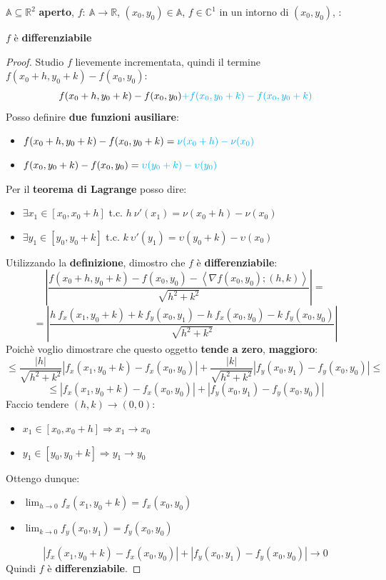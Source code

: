 \documentclass[a4paper, oneside]{article}
\newcommand\R{\mathbb{R}}
\newcommand\C{\mathbb{C}}
\newcommand\A{\mathbb{A}}
\begin{document}
    \begin{theorem}
         $\A\subseteq\R^2$ \textbf{aperto}, $f: \ \A\to\R$, $(x_0,y_0)\in\A$, $f\in\C^1$ in un intorno di $(x_0,y_0)$, :
        \begin{center}
            $f$ è \textbf{differenziabile}
        \end{center}
    \end{theorem}
    \begin{proof}
        Studio $f$ lievemente incrementata, quindi il termine $f(x_0 + h,y_0 + k) - f(x_0,y_0)$:
        \[f(x_0 + h,y_0 + k) - f(x_0,y_0) \textcolor{cyan}{+f(x_0,y_0+k) - f(x_0,y_0+k)}\]
        Posso definire \textbf{due funzioni ausiliare}:
        \begin{itemize}
            \item $f(x_0 + h,y_0 + k) - f(x_0,y_0+k) = \textcolor{cyan}{\nu (x_0+h) - \nu(x_0)}$
            \item $f(x_0,y_0 + k) - f(x_0,y_0) = \textcolor{cyan}{\upsilon (y_0+k) - \upsilon(y_0)}$
        \end{itemize}
        Per il \textbf{teorema di Lagrange} posso dire:
        \begin{itemize}
            \item $\exists x_1 \in [x_0,x_0+h]$ t.c. $h \ \nu'(x_1) = \nu (x_0+h) - \nu(x_0)$
            \item $\exists y_1 \in [y_0,y_0+k]$ t.c. $k \ \upsilon'(y_1) = \upsilon (y_0+k) - \upsilon(x_0)$
        \end{itemize}
        Utilizzando la \textbf{definizione}, dimostro che $f$ è \textbf{differenziabile}:
        \[\left|\frac{f(x_0 + h,y_0 + k) - f(x_0,y_0) - \left\langle \nabla f(x_0,y_0);(h,k)\right\rangle }{\sqrt{h^2+k^2}}\right|=\]
        \[=\left|\frac{h \ f_x(x_1,y_0+k)+k \ f_y(x_0,y_1) - h \ f_x(x_0,y_0) - k \ f_y(x_0,y_0)}{\sqrt{h^2+k^2}}\right|\]
        Poichè voglio dimostrare che questo oggetto \textbf{tende a zero}, \textbf{maggioro}:
        \[\leq \frac{|h|}{\sqrt{h^2+k^2}} \left|f_x(x_1,y_0+k) - f_x(x_0,y_0)\right| + \frac{|k|}{\sqrt{h^2+k^2}} \left|f_y(x_0,y_1) - f_y(x_0,y_0)\right| \leq\]
        \[\leq \left|f_x(x_1,y_0+k) - f_x(x_0,y_0)\right| + \left|f_y(x_0,y_1) - f_y(x_0,y_0)\right|\]
        Faccio tendere $(h,k)\to(0,0)$:
        \begin{itemize}
            \item $x_1\in[x_0,x_0+h] \Longrightarrow x_1\to x_0$
            \item $y_1\in[y_0,y_0+k] \Longrightarrow y_1\to y_0$
        \end{itemize}
        Ottengo dunque:
        \begin{itemize}
            \item $\displaystyle \lim_{h\to 0} f_x(x_1,y_0+k) = f_x(x_0,y_0)$
            \item $\displaystyle \lim_{k\to 0} f_y(x_0,y_1) = f_y(x_0,y_0)$
        \end{itemize}
        \[\left|f_x(x_1,y_0+k) - f_x(x_0,y_0)\right| + \left|f_y(x_0,y_1) - f_y(x_0,y_0)\right|\to 0\]
        Quindi $f$ è \textbf{differenziabile}.
    \end{proof}
\end{document}
